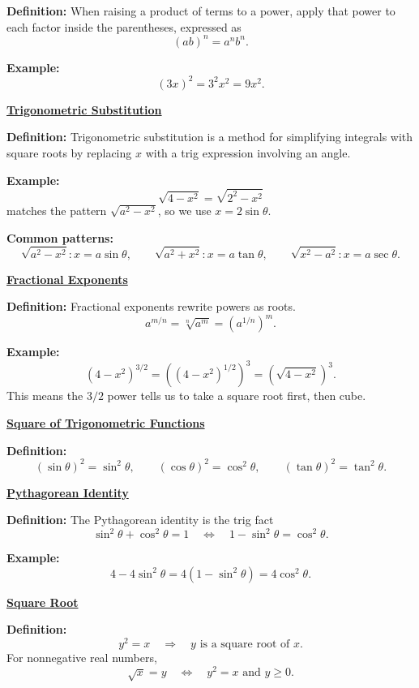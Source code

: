 \documentclass{article}
\newcommand{\defanchor}[1]{\hypertarget{def:#1}{}}
\newcommand{\backtoterm}[2]{\hyperlink{q:#1}{\textbf{#2}}}
\begin{document}
    \textbf{Definition:}
    When raising a product of terms to a power, apply that power to each factor inside the parentheses, expressed as
    \[
    (ab)^n = a^n b^n.
    \]

    \textbf{Example:}
    \[
    (3x)^2=3^2x^2=9x^2.
    \]

    \defanchor{trig-sub}\backtoterm{trig-sub}{Trigonometric Substitution}

    \textbf{Definition:}
    Trigonometric substitution is a method for simplifying integrals with square roots by replacing $x$
    with a trig expression involving an angle.

    \textbf{Example:}
    \[
    \sqrt{4-x^2}=\sqrt{2^2-x^2}
    \]
    matches the pattern $\sqrt{a^2-x^2}$, so we use $x=2\sin\theta$.

    \textbf{Common patterns:}
    \[
    \sqrt{a^2-x^2}: x=a\sin\theta,\qquad
    \sqrt{a^2+x^2}: x=a\tan\theta,\qquad
    \sqrt{x^2-a^2}: x=a\sec\theta.
    \]

    \defanchor{frac-exp}\backtoterm{frac-exp}{Fractional Exponents}

    \textbf{Definition:}
    Fractional exponents rewrite powers as roots.
    \[
    a^{m/n}=\sqrt[n]{a^m}=\left(a^{1/n}\right)^m.
    \]

    \textbf{Example:}
    \[
    (4-x^2)^{3/2}=\left((4-x^2)^{1/2}\right)^3=\left(\sqrt{4-x^2}\right)^3.
    \]
    This means the $3/2$ power tells us to take a square root first, then cube.

    \defanchor{notation}\backtoterm{notation}{Square of Trigonometric Functions}

    \textbf{Definition:}
    \[
    (\sin\theta)^2=\sin^2\theta,\qquad
    (\cos\theta)^2=\cos^2\theta,\qquad
    (\tan\theta)^2=\tan^2\theta.
    \]

    \defanchor{pyth-id}\backtoterm{pyth-id}{Pythagorean Identity}

    \textbf{Definition:}
    The Pythagorean identity is the trig fact
    \[
    \sin^2\theta+\cos^2\theta=1
    \quad\Longleftrightarrow\quad
    1-\sin^2\theta=\cos^2\theta.
    \]

    \textbf{Example:}
    \[
    4-4\sin^2\theta=4(1-\sin^2\theta)=4\cos^2\theta.
    \]

    \defanchor{square-root}\backtoterm{square-root}{Square Root}

    \textbf{Definition:}
    \[
    y^2=x
    \quad\Longrightarrow\quad
    y \text{ is a square root of } x.
    \]
    For nonnegative real numbers,
    \[
    \sqrt{x}=y
    \quad\Longleftrightarrow\quad
    y^2=x \text{ and } y\ge 0.
    \]
\end{document}

